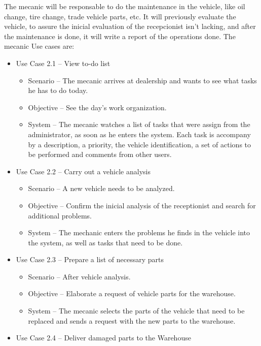   The mecanic will be responsable to do the maintenance in the vehicle, like oil change, tire change, trade vehicle parts, etc. 
  It will previously evaluate the vehicle, to assure the inicial evaluation of the recepcionist isn't lacking, and after the maintenance is done, it will write a report of the operations done. 
  The mecanic Use cases are:

  \begin{itemize}
    \item Use Case 2.1 – View to-do list
    \begin{itemize}
      \item Scenario – The mecanic arrives at dealership and wants to see what tasks he has to do today.
      \item Objective – See the day's work organization.
      \item System – The mecanic watches a list of tasks that were assign from the administrator, as soon as he enters the system. Each task is accompany by a description, a priority, the vehicle identification, a set of actions to be performed and comments from other users. 
    \end{itemize}
    \item Use Case 2.2 – Carry out a vehicle analysis 
    \begin{itemize}
      \item Scenario – A new vehicle needs to be analyzed.
      \item Objective – Confirm the inicial analysis of the receptionist and search for additional problems.
      \item System – The mechanic enters the problems he finds in the vehicle into the system, as well as tasks that need to be done. 
    \end{itemize}
    \item Use Case 2.3 – Prepare a list of necessary parts
    \begin{itemize}
      \item Scenario – After vehicle analysis.
      \item Objective – Elaborate a request of vehicle parts for the warehouse.
      \item System – The mecanic selects the parts of the vehicle that need to be replaced and sends a request with the new parts to the warehouse.
    \end{itemize}
    \item Use Case 2.4 – Deliver damaged parts to the Warehouse
    \begin{itemize}

\end{itemize}
\end{itemize}
